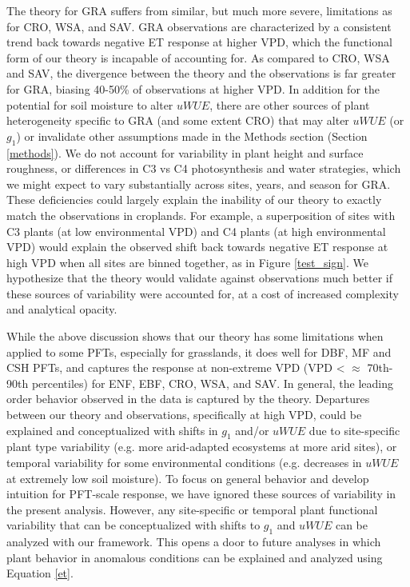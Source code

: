 \documentclass[draft,linenumbers]{afmjournal}
\begin{document}
The theory for GRA suffers from similar, but much more severe,
limitations as for CRO, WSA, and SAV. GRA observations are
characterized by a consistent trend back towards negative ET response
at higher VPD, which the functional form of our theory is incapable of
accounting for. As compared to CRO, WSA and SAV, the divergence
between the theory and the observations is far greater for GRA,
biasing 40-50\% of observations at higher VPD. In addition for the
potential for soil moisture to alter $uWUE$, there are other sources
of plant heterogeneity specific to GRA (and some extent CRO) that may
alter $uWUE$ (or $g_1$) or invalidate other assumptions made in the
Methods section (Section \ref{methods}). We do not account for
variability in plant height and surface roughness, or differences in
C3 vs C4 photosynthesis and water strategies, which we might expect to
vary substantially across sites, years, and season for GRA. These
deficiencies could largely explain the inability of our theory to
exactly match the observations in croplands. For example, a
superposition of sites with C3 plants (at low environmental VPD) and
C4 plants (at high environmental VPD) would explain the observed shift
back towards negative ET response at high VPD when all sites are
binned together, as in Figure \ref{test_sign}. We hypothesize that the
theory would validate against observations much better if these
sources of variability were accounted for, at a cost of increased
complexity and analytical opacity. 


While the above discussion shows that our theory has some limitations
when applied to some PFTs, especially for grasslands, it does well for
DBF, MF and CSH PFTs, and captures the response at non-extreme VPD
(VPD < $\approx$ 70th-90th percentiles) for
ENF, EBF, CRO, WSA, and SAV. In general, the leading order behavior
observed in the data is captured by the theory. Departures between our
theory and observations, specifically at high VPD, could be explained
and conceptualized with shifts in $g_1$ and/or $uWUE$ due to
site-specific plant type variability (e.g. more arid-adapted ecosystems
at more arid sites), or temporal variability for some environmental
conditions (e.g. decreases in $uWUE$ at extremely low soil
moisture). To focus on general behavior and develop intuition for
PFT-scale response, we have ignored these sources of variability in
the present analysis. However, any site-specific or temporal plant
functional variability that can be conceptualized with shifts to $g_1$
and $uWUE$ can be analyzed with our framework. This opens a door to future analyses in which plant behavior in anomalous conditions
can be explained and analyzed using Equation \ref{et}.
\end{document}
